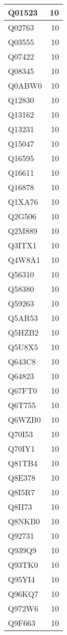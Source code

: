 \documentclass[
]{book}
\theoremstyle{definition}
\theoremstyle{definition}
\theoremstyle{definition}
\theoremstyle{definition}
\theoremstyle{remark}
\begin{document}
\begin{table}
\begin{tabular}{l|r}
\hline
Q01523 & 10\\
\hline
Q02763 & 10\\
\hline
Q03555 & 10\\
\hline
Q07422 & 10\\
\hline
Q08345 & 10\\
\hline
Q0ABW0 & 10\\
\hline
Q12830 & 10\\
\hline
Q13162 & 10\\
\hline
Q13231 & 10\\
\hline
Q15047 & 10\\
\hline
Q16595 & 10\\
\hline
Q16611 & 10\\
\hline
Q16878 & 10\\
\hline
Q1XA76 & 10\\
\hline
Q2G506 & 10\\
\hline
Q2M889 & 10\\
\hline
Q3ITX1 & 10\\
\hline
Q4W8A1 & 10\\
\hline
Q56310 & 10\\
\hline
Q58380 & 10\\
\hline
Q59263 & 10\\
\hline
Q5AR53 & 10\\
\hline
Q5HZB2 & 10\\
\hline
Q5U8X5 & 10\\
\hline
Q643C8 & 10\\
\hline
Q64823 & 10\\
\hline
Q67FT0 & 10\\
\hline
Q6T755 & 10\\
\hline
Q6WZB0 & 10\\
\hline
Q70I53 & 10\\
\hline
Q70IY1 & 10\\
\hline
Q81TB4 & 10\\
\hline
Q8E378 & 10\\
\hline
Q8I5R7 & 10\\
\hline
Q8II73 & 10\\
\hline
Q8NKB0 & 10\\
\hline
Q92731 & 10\\
\hline
Q939Q9 & 10\\
\hline
Q93TK0 & 10\\
\hline
Q95YI4 & 10\\
\hline
Q96KQ7 & 10\\
\hline
Q972W6 & 10\\
\hline
Q9F663 & 10\\

\end{tabular}
\end{table}
\end{document}
